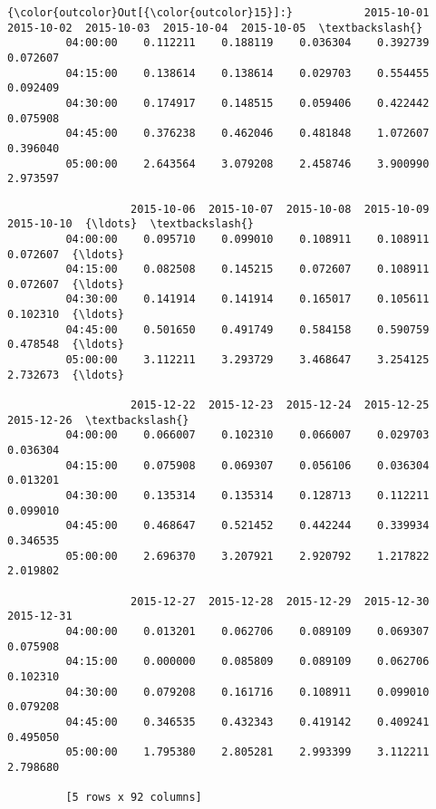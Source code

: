 \documentclass[11pt]{article}
\begin{document}
\begin{Verbatim}[commandchars=\\\{\}]
{\color{outcolor}Out[{\color{outcolor}15}]:}           2015-10-01  2015-10-02  2015-10-03  2015-10-04  2015-10-05  \textbackslash{}
         04:00:00    0.112211    0.188119    0.036304    0.392739    0.072607   
         04:15:00    0.138614    0.138614    0.029703    0.554455    0.092409   
         04:30:00    0.174917    0.148515    0.059406    0.422442    0.075908   
         04:45:00    0.376238    0.462046    0.481848    1.072607    0.396040   
         05:00:00    2.643564    3.079208    2.458746    3.900990    2.973597   
         
                   2015-10-06  2015-10-07  2015-10-08  2015-10-09  2015-10-10  {\ldots}  \textbackslash{}
         04:00:00    0.095710    0.099010    0.108911    0.108911    0.072607  {\ldots}   
         04:15:00    0.082508    0.145215    0.072607    0.108911    0.072607  {\ldots}   
         04:30:00    0.141914    0.141914    0.165017    0.105611    0.102310  {\ldots}   
         04:45:00    0.501650    0.491749    0.584158    0.590759    0.478548  {\ldots}   
         05:00:00    3.112211    3.293729    3.468647    3.254125    2.732673  {\ldots}   
         
                   2015-12-22  2015-12-23  2015-12-24  2015-12-25  2015-12-26  \textbackslash{}
         04:00:00    0.066007    0.102310    0.066007    0.029703    0.036304   
         04:15:00    0.075908    0.069307    0.056106    0.036304    0.013201   
         04:30:00    0.135314    0.135314    0.128713    0.112211    0.099010   
         04:45:00    0.468647    0.521452    0.442244    0.339934    0.346535   
         05:00:00    2.696370    3.207921    2.920792    1.217822    2.019802   
         
                   2015-12-27  2015-12-28  2015-12-29  2015-12-30  2015-12-31  
         04:00:00    0.013201    0.062706    0.089109    0.069307    0.075908  
         04:15:00    0.000000    0.085809    0.089109    0.062706    0.102310  
         04:30:00    0.079208    0.161716    0.108911    0.099010    0.079208  
         04:45:00    0.346535    0.432343    0.419142    0.409241    0.495050  
         05:00:00    1.795380    2.805281    2.993399    3.112211    2.798680  
         
         [5 rows x 92 columns]
\end{Verbatim}
            
\end{document}
